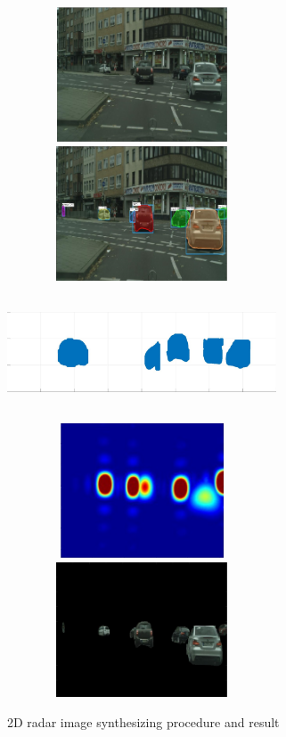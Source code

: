 \begin{figure}
	\centering
	\includegraphics[width=8cm,height=4cm]{./figure/2d_origin.jpg}\\
	\vspace{0.2 cm}
	\includegraphics[width=8cm,height=4cm]{./figure/2d_detect.jpg}\\

	\includegraphics[width=8cm,height=4cm]{./figure/3d_cam.jpg}\\

	\includegraphics[width=8cm,height=4cm]{./figure/2D_heatmap.jpg}\\
	\vspace{0.2 cm}
	\includegraphics[width=8cm,height=4cm]{./figure/2d_select.jpg}\\
	\caption{2D radar image synthesizing procedure and result}
	\label{2D_synth}
\end{figure}

